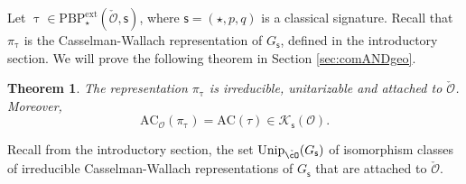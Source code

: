\documentclass[12pt,a4paper]{amsart}
\newcommand{\CK}{{\mathcal {K}}}
\newcommand{\CO}{{\mathcal {O}}}
\numberwithin{equation}{section}
\newtheorem{thm}{Theorem}[section]
\theoremstyle{remark}
\def\Unip{\mathrm{Unip}}
\def\PBPe{\mathrm{PBP}^{\mathrm{ext}}}
\begin{document}
Let $\uptau\in \PBPe_\star(\check \CO,\mathsf s)$, where $\mathsf s=(\star, p,q)$ is a classical signature. Recall that $\pi_\uptau$ is the Casselman-Wallach representation of $G_{\mathsf s}$, defined in the introductory section.
We will prove the following theorem in Section \ref{sec:comANDgeo}.

\begin{thm}\label{thmpitau}
The representation $\pi_\uptau$ is irreducible, unitarizable and attached to $\check \CO$. Moreover,
\[
\mathrm{AC}_\CO(\pi_\uptau)=\mathrm{AC}(\tau)\in \CK_{\mathsf s}(\CO).
\]
\end{thm}


Recall from the introductory section, the set $\Unip_{\check \cO}(G_\mathsf s)$ of isomorphism classes of irreducible Casselman-Wallach representations of $G_\mathsf s$ that are attached to $\check \CO$.
\end{document}
